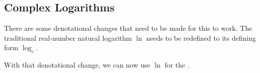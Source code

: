 \subsection{Complex Logarithms}\label{subsec:Complex_Logarithms}
There are some denotational changes that need to be made for this to work.
The traditional real-number natural logarithm $\ln$ needs to be redefined to its defining form $\log_{e}$.

With that denotational change, we can now use $\ln$ for the .


